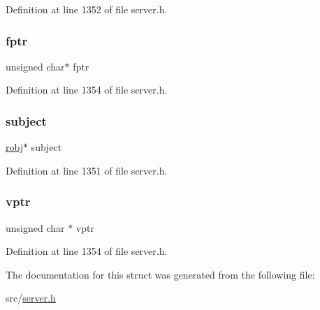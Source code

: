 Definition at line 1352 of file server.\+h.

\mbox{\label{structhash_type_iterator_a9deec0c53e9848ebf973fba86d4670a3}} 
\subsubsection{\texorpdfstring{fptr}{fptr}}
{\footnotesize\ttfamily unsigned char$\ast$ fptr}



Definition at line 1354 of file server.\+h.

\mbox{\label{structhash_type_iterator_a8bd087874443f3e41cf5f728d8490693}} 
\subsubsection{\texorpdfstring{subject}{subject}}
{\footnotesize\ttfamily \hyperlink{server_8h_a540f174d2685422fbd7d12e3cd44c8e2}{robj}$\ast$ subject}



Definition at line 1351 of file server.\+h.

\mbox{\label{structhash_type_iterator_a5ead8d514dee29377ba31dc48066cb2c}} 
\subsubsection{\texorpdfstring{vptr}{vptr}}
{\footnotesize\ttfamily unsigned char $\ast$ vptr}



Definition at line 1354 of file server.\+h.



The documentation for this struct was generated from the following file\+:\begin{DoxyCompactItemize}
\item 
src/\hyperlink{server_8h}{server.\+h}\end{DoxyCompactItemize}
